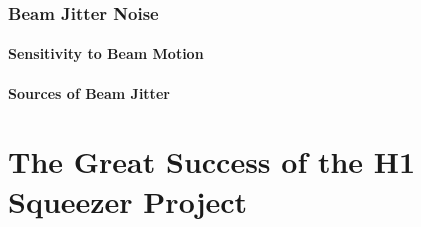 \documentclass[12pt,vi,twoside]{mitthesis}
\begin{document}
\subsection{Beam Jitter Noise}
\subsubsection{Sensitivity to Beam Motion}
\subsubsection{Sources of Beam Jitter}

\chapter{The Great Success of the H1 Squeezer Project}

\appendix


\end{document}
